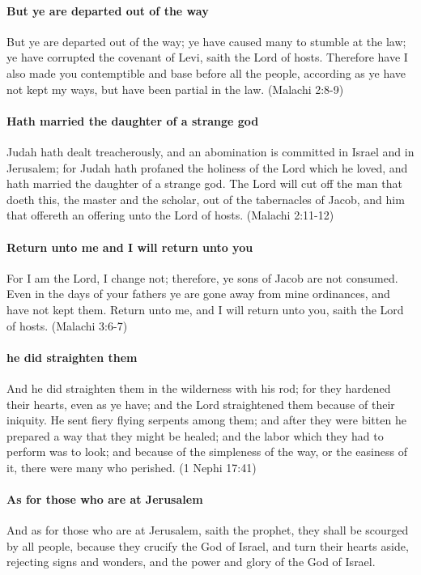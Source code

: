 \paragraph{But ye are departed out of the way}
But ye are departed out of the way; ye have caused many to stumble at the law; ye have corrupted the covenant of Levi, saith the Lord of hosts. Therefore have I also made you contemptible and base before all the people, according as ye have not kept my ways, but have been partial in the law. (Malachi 2:8-9)

\paragraph{Hath married the daughter of a strange god}
Judah hath dealt treacherously, and an abomination is committed in Israel and in Jerusalem; for Judah hath profaned the holiness of the Lord which he loved, and hath married the daughter of a strange god. The Lord will cut off the man that doeth this, the master and the scholar, out of the tabernacles of Jacob, and him that offereth an offering unto the Lord of hosts. (Malachi 2:11-12)

\paragraph{Return unto me and I will return unto you}
For I am the Lord, I change not; therefore, ye sons of Jacob are not consumed. Even in the days of your fathers ye are gone away from mine ordinances, and have not kept them. Return unto me, and I will return unto you, saith the Lord of hosts. (Malachi 3:6-7)

\paragraph{he did straighten them}
And he did straighten them in the wilderness with his rod; for they hardened their hearts, even as ye have; and the Lord straightened them because of their iniquity. He sent fiery flying serpents among them; and after they were bitten he prepared a way that they might be healed; and the labor which they had to perform was to look; and because of the simpleness of the way, or the easiness of it, there were many who perished. (1 Nephi 17:41)

\paragraph{As for those who are at Jerusalem}
And as for those who are at Jerusalem, saith the prophet, they shall be scourged by all people, because they crucify the God of Israel, and turn their hearts aside, rejecting signs and wonders, and the power and glory of the God of Israel.

